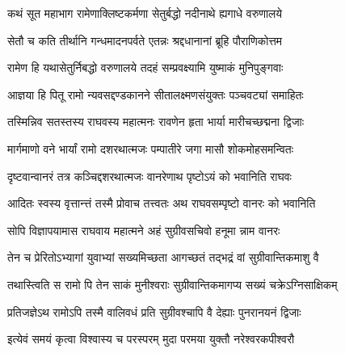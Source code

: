 
\tags{}

\storymeta





\twolineshloka
{कथं सूत महाभाग रामेणाक्लिष्टकर्मणा}
{सेतुर्बद्धो नदीनाथे ह्यगाधे वरुणालये}%

\twolineshloka
{सेतौ च कति तीर्थानि गन्धमादनपर्वते}
{एतन्नः श्रद्दधानानां ब्रूहि पौराणिकोत्तम}%


\twolineshloka
{रामेण हि यथासेतुर्निबद्धो वरुणालये}
{तदहं सम्प्रवक्ष्यामि युष्माकं मुनिपुङ्गवाः}%

\twolineshloka
{आज्ञया हि पितू रामो न्यवसद्दण्डकानने}
{सीतालक्ष्मणसंयुक्तः पञ्चवट्यां समाहितः}%

\twolineshloka
{तस्मिन्निव सतस्तस्य राघवस्य महात्मनः}
{रावणेन हृता भार्या मारीचच्छद्मना द्विजाः}%

\twolineshloka
{मार्गमाणो वने भार्यां रामो दशरथात्मजः}
{पम्पातीरे जगा मासौ शोकमोहसमन्वितः}%

\twolineshloka
{दृष्टवान्वानरं तत्र कञ्चिद्दशरथात्मजः}
{वानरेणाथ पृष्टोऽयं को भवानिति राघवः}%

\twolineshloka
{आदितः स्वस्य वृत्तान्त्तं तस्मै प्रोवाच तत्त्वतः}
{अथ राघवसम्पृष्टो वानरः को भवानिति}%

\twolineshloka
{सोपि विज्ञापयामास राघवाय महात्मने}
{अहं सुग्रीवसचिवो हनूमा न्नाम वानरः}%

\twolineshloka
{तेन च प्रेरितोऽभ्यागां युवाभ्यां सख्यमिच्छता}
{आगच्छतं तद्भद्रं वां सुग्रीवान्तिकमाशु वै}%

\twolineshloka
{तथास्त्विति स रामो पि तेन साकं मुनीश्वराः}
{सुग्रीवान्तिकमागप्य सख्यं चक्रेऽग्निसाक्षिकम्}%

\twolineshloka
{प्रतिजज्ञेऽथ रामोऽपि तस्मै वालिवधं प्रति}
{सुग्रीवश्चापि वै देह्याः पुनरानयनं द्विजाः}%

\twolineshloka
{इत्येवं समयं कृत्वा विश्वास्य च परस्परम्}
{मुदा परमया युक्तौ नरेश्वरकपीश्वरौ}%

